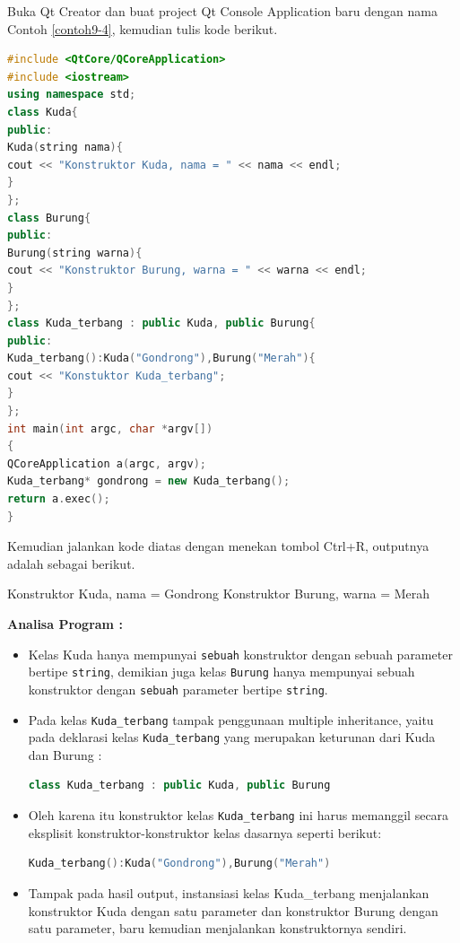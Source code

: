 Buka Qt Creator dan buat project Qt Console Application baru dengan nama
Contoh \ref{contoh9-4}, kemudian tulis kode berikut.

\begin{lstlisting}[language=c++, caption=Konstruktor Kelas Multiple Inheritance, label=contoh9-4]
#include <QtCore/QCoreApplication>
#include <iostream>
using namespace std;
class Kuda{
public:
Kuda(string nama){
cout << "Konstruktor Kuda, nama = " << nama << endl;
}
};
class Burung{
public:
Burung(string warna){
cout << "Konstruktor Burung, warna = " << warna << endl;
}
};
class Kuda_terbang : public Kuda, public Burung{
public:
Kuda_terbang():Kuda("Gondrong"),Burung("Merah"){
cout << "Konstuktor Kuda_terbang";
}
};
int main(int argc, char *argv[])
{
QCoreApplication a(argc, argv);
Kuda_terbang* gondrong = new Kuda_terbang();
return a.exec();
}
\end{lstlisting}

Kemudian jalankan kode diatas dengan menekan tombol Ctrl+R, outputnya
adalah sebagai berikut.

\begin{lcverbatim}
Konstruktor Kuda, nama = Gondrong
Konstruktor Burung, warna = Merah
\end{lcverbatim}

\textbf{Analisa Program :}

\begin{itemize}
\item
  Kelas Kuda hanya mempunyai \texttt{sebuah} konstruktor dengan sebuah
  parameter bertipe \texttt{string}, demikian juga kelas \texttt{Burung}
  hanya mempunyai sebuah konstruktor dengan \texttt{sebuah} parameter
  bertipe \texttt{string}.
\item
  Pada kelas \texttt{Kuda\_terbang} tampak penggunaan multiple
  inheritance, yaitu pada deklarasi kelas \texttt{Kuda\_terbang} yang
  merupakan keturunan dari Kuda dan Burung :

\begin{lstlisting}[language=c++, numbers=none]
class Kuda_terbang : public Kuda, public Burung
\end{lstlisting}
\item
  Oleh karena itu konstruktor kelas \texttt{Kuda\_terbang} ini harus
  memanggil secara eksplisit konstruktor-konstruktor kelas dasarnya
  seperti berikut:

\begin{lstlisting}[language=c++, numbers=none]
Kuda_terbang():Kuda("Gondrong"),Burung("Merah")
\end{lstlisting}
\item
  Tampak pada hasil output, instansiasi kelas Kuda\_terbang menjalankan
  konstruktor Kuda dengan satu parameter dan konstruktor Burung dengan
  satu parameter, baru kemudian menjalankan konstruktornya sendiri.
\end{itemize}

